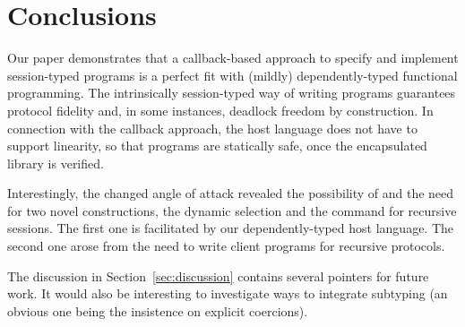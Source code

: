 \documentclass[acmsmall,review,anonymous,screen]{acmart}
\begin{document}

\section{Conclusions}
\label{sec:conclusions}

Our paper demonstrates that a callback-based approach to
specify and implement session-typed programs is a perfect fit with (mildly)
dependently-typed functional programming. The intrinsically
session-typed way of writing programs guarantees protocol fidelity and,
in some instances, deadlock freedom 
by construction. In connection with the callback approach, the host
language does not have to support linearity, so that programs are
statically safe, once the encapsulated library is verified.

Interestingly, the changed angle of attack revealed the possibility of
and the need for two novel constructions, the dynamic selection and
the {\AUNROLL} command for recursive sessions. The first one is
facilitated by our dependently-typed host language. The second one
arose from the need to write client programs for recursive protocols. 

The discussion in Section~\ref{sec:discussion} contains several
pointers for future work. It would also be interesting to investigate
ways to integrate subtyping (an obvious one being the insistence on
explicit coercions).






\end{document}
